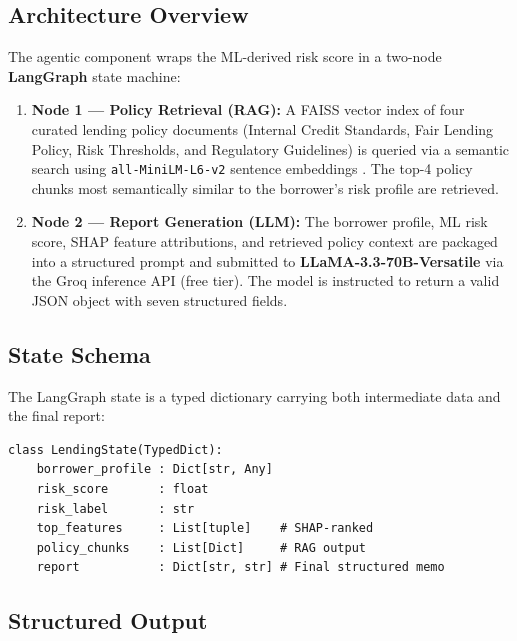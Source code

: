 \documentclass[11pt,a4paper]{article}
\begin{document}
\subsection{Architecture Overview}

The agentic component wraps the ML-derived risk score in a two-node
\textbf{LangGraph} \cite{langgraph2024} state machine:

\begin{enumerate}
    \item \textbf{Node 1 — Policy Retrieval (RAG):} A FAISS \cite{johnson2019billion}
          vector index of four curated lending policy documents (Internal Credit Standards,
          Fair Lending Policy, Risk Thresholds, and Regulatory Guidelines) is queried via
          a semantic search using \texttt{all-MiniLM-L6-v2} sentence embeddings
          \cite{reimers2019}. The top-4 policy chunks most semantically similar to the
          borrower's risk profile are retrieved.
    \item \textbf{Node 2 — Report Generation (LLM):} The borrower profile, ML risk score,
          SHAP feature attributions, and retrieved policy context are packaged into a
          structured prompt and submitted to
          \textbf{LLaMA-3.3-70B-Versatile} \cite{touvron2023} via the
          Groq inference API (free tier). The model is instructed to return a valid JSON
          object with seven structured fields.
\end{enumerate}

\subsection{State Schema}

The LangGraph state is a typed dictionary carrying both intermediate data and the
final report:

\begin{lstlisting}[caption={LangGraph state schema.}]
class LendingState(TypedDict):
    borrower_profile : Dict[str, Any]
    risk_score       : float
    risk_label       : str
    top_features     : List[tuple]    # SHAP-ranked
    policy_chunks    : List[Dict]     # RAG output
    report           : Dict[str, str] # Final structured memo
\end{lstlisting}

\subsection{Structured Output}
\end{document}
